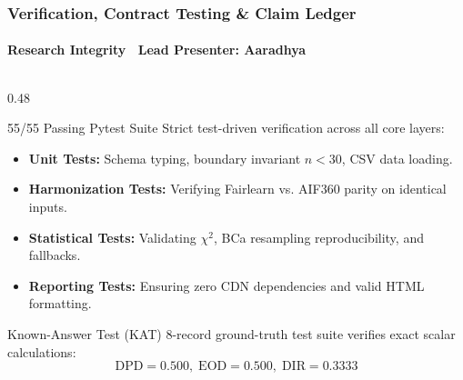 \begin{frame}
  \frametitle{Verification, Contract Testing \& Claim Ledger}
  \framesubtitle{Research Integrity \textbar\ Lead Presenter: Aaradhya}

  \begin{columns}[T]
    \begin{column}{0.48\textwidth}
      \begin{card}{55/55 Passing Pytest Suite}
        \scriptsize
        Strict test-driven verification across all core layers:
        \vspace{0.05cm}
        \begin{itemize}\scriptsize
          \item \textbf{Unit Tests:} Schema typing, boundary invariant $n < 30$, CSV data loading.
          \item \textbf{Harmonization Tests:} Verifying Fairlearn vs. AIF360 parity on identical inputs.
          \item \textbf{Statistical Tests:} Validating $\chi^2$, BCa resampling reproducibility, and fallbacks.
          \item \textbf{Reporting Tests:} Ensuring zero CDN dependencies and valid HTML formatting.
        \end{itemize}
      \end{card}

      \vspace{0.1cm}
      \begin{statcard}{Known-Answer Test (KAT)}
        \scriptsize 8-record ground-truth test suite verifies exact scalar calculations:
        $$\text{DPD}=0.500, \; \text{EOD}=0.500, \; \text{DIR}=0.3333$$
      \end{statcard}
    \end{column}


\end{columns}
\end{frame}

